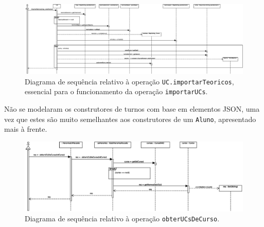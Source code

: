 \documentclass[12pt, a4paper]{article}
\begin{document}
\begin{landscape}
        \begin{figure}[H]
            \centering
            \includegraphics[scale=0.50]{Imagens/Modelos/importarUCsConstrutorUCimportarTeoricosDAO.svg.eps}
            \caption{
                Diagrama de sequência relativo à operação \texttt{UC.importarTeoricos}, essencial para o
                funcionamento da operação \texttt{importarUCs}.
            }
        \end{figure}

        Não se modelaram os construtores de turnos com base em elementos JSON, uma vez que estes são
        muito semelhantes aos construtores de um \texttt{Aluno}, apresentado mais à frente.

        \vspace*{\fill}
        \pagebreak
        \vspace*{\fill}

        \begin{figure}[H]
            \centering
            \includegraphics[scale=0.75]{Imagens/Modelos/obterUCsDeCursoDAO.svg.eps}
            \caption{
                Diagrama de sequência relativo à operação \texttt{obterUCsDeCurso}.
            }
        \end{figure}

        \vspace*{\fill}
        \pagebreak
        \vspace*{\fill}


\end{landscape}
\end{document}
